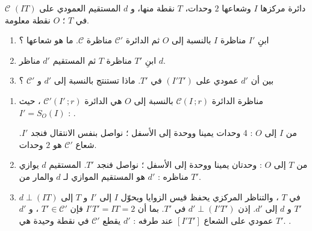 \documentclass[12pt,a4paper]{article}
\begin{document}
\begin{corr}[title={مناظرة دائرة}, stars=2, source={Axiomaths}]
$\mathcal{C}$ دائرة مركزها $I$ وشعاعها $2$ وحدات، $T$ نقطة منها، و $d$ المستقيم العمودي على $(IT)$ في $T$ ؛ $O$ نقطة معلومة.
\begin{center}
\end{center}
\begin{enumerate}
  \item ابنِ $I'$ مناظرة $I$ بالنسبة إلى $O$ ثم الدائرة $\mathcal{C}'$ مناظرة $\mathcal{C}$. ما هو شعاعها ؟
  \item ابنِ $T'$ مناظرة $T$ ثم المستقيم $d'$ مناظر $d$.
  \item بين أن $d'$ عمودي على $(I'T')$ في $T'$. ماذا تستنتج بالنسبة إلى $d'$ و $\mathcal{C}'$ ؟
\end{enumerate}
\axsol
\begin{enumerate}[itemsep=14pt]
  \item\leavevmode
  \begin{prop}
  مناظرة الدائرة $\mathcal{C}(I\,;r)$ بالنسبة إلى $O$ هي الدائرة $\mathcal{C}'(I'\,;r)$ ، حيث $I'=S_O(I)$ : .
  \end{prop}
  من $I$ إلى $O$ : 4 وحدات يمينا ووحدة إلى الأسفل ؛ نواصل بنفس الانتقال فنجد $I'$. شعاع $\mathcal{C}'$ هو $2$ وحدات.
  \item من $T$ إلى $O$ : وحدتان يمينا ووحدة إلى الأسفل ؛ نواصل فنجد $T'$. المستقيم $d$ يوازي مناظره : $d'$ هو المستقيم الموازي لـ $d$ والمار من $T'$.
  \begin{center}
  \end{center}
  \item $d\perp(IT)$ في $T$ ، والتناظر المركزي يحفظ قيس الزوايا ويحوّل $I$ إلى $I'$ و $T$ إلى $T'$ و $d$ إلى $d'$. إذن $d'\perp(I'T')$ في $T'$.
  بما أن $I'T'=IT=2$ فإن $T'\in\mathcal{C}'$ ، و $d'$ عمودي على الشعاع $[I'T']$ عند طرفه : $d'$ يقطع $\mathcal{C}'$ في نقطة وحيدة هي $T'$. .
\end{enumerate}
\end{corr}
\end{document}

